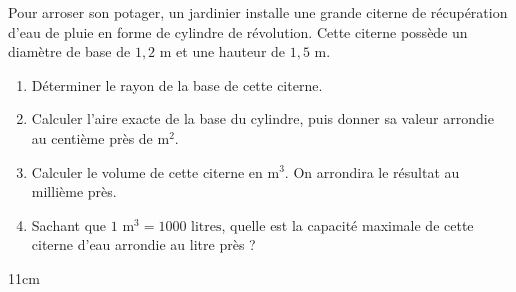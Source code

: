 \documentclass[a4paper]{book}
\begin{document}
    \begin{exercice}
        Pour arroser son potager, un jardinier installe une grande citerne de récupération d'eau de pluie en forme de cylindre de révolution. 
        Cette citerne possède un diamètre de base de $1,2\text{ m}$ et une hauteur de $1,5\text{ m}$.
        
        \begin{enumerate}
            \item Déterminer le rayon de la base de cette citerne.
            \item Calculer l'aire exacte de la base du cylindre, puis donner sa valeur arrondie au centième près de $\text{m}^2$.
            \item Calculer le volume de cette citerne en $\text{m}^3$. On arrondira le résultat au millième près.
            \item Sachant que $1\text{ m}^3 = 1000\text{ litres}$, quelle est la capacité maximale de cette citerne d'eau arrondie au litre près ?
        \end{enumerate}
    \end{exercice}
    
    \begin{ZoneReponse}{11cm}
    \end{ZoneReponse}
\end{document}
